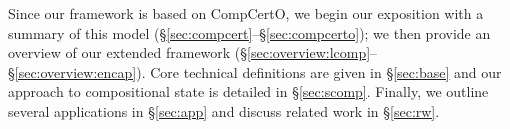 \documentclass[acmsmall,screen,review,anonymous]{acmart}
\begin{document}
Since our framework is based on CompCertO,
we begin our exposition with a summary of this model
(\S\ref{sec:compcert}--\S\ref{sec:compcerto});
we then provide an overview of our extended framework
(\S\ref{sec:overview:lcomp}--\S\ref{sec:overview:encap}).
Core technical definitions are given in \S\ref{sec:base}
and our approach to compositional state is detailed in \S\ref{sec:scomp}.
Finally, we outline several applications in \S\ref{sec:app}
and discuss related work in \S\ref{sec:rw}.


%
%
%
%
%
%
\end{document}
